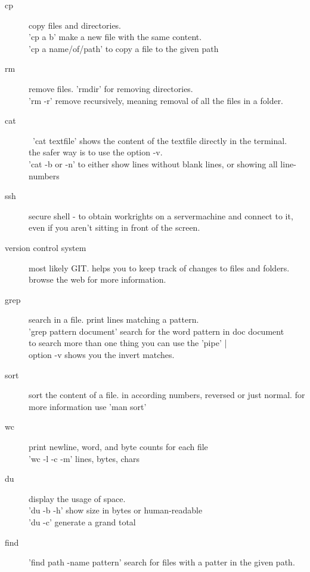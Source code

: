 \documentclass[10pt,a4paper]{scrartcl}
\begin{document}
\begin{description}
\item[cp]
copy files and directories.\\
'cp a b' make a new file with the same content.\\
'cp a name/of/path' to copy a file to the given path

\item[rm]
remove files. 'rmdir' for removing directories.\\
'rm -r' remove recursively, meaning removal of all the files in a folder.

\item[cat]\
'cat textfile' shows the content of the textfile directly in the terminal.\\
the safer way is to use the option -v.\\
'cat -b or -n' to either show lines without blank lines, or showing all line-numbers

\item[ssh]
secure shell - to obtain workrights on a servermachine and connect to it, even if you aren't sitting in front of the screen.

\item[version control system]
most likely GIT. helps you to keep track of changes to files and folders.\\
browse the web for more information.

\item[grep]
search in a file. print lines matching a pattern.\\
'grep pattern document' search for the word pattern in doc document\\
to search more than one thing you can use the 'pipe' |\\
option -v shows you the invert matches.

\item[sort]
sort the content of a file. in according numbers, reversed or just normal. for more information use 'man sort'

\item[wc]
print newline, word, and byte counts for each file\\
'wc -l -c -m' lines, bytes, chars

\item[du]
display the usage of space. \\
'du -b -h' show size in bytes or human-readable\\
'du -c' generate a grand total

\item[find]
'find path -name pattern' search for files with a patter in the given path.


\end{description}
\end{document}
